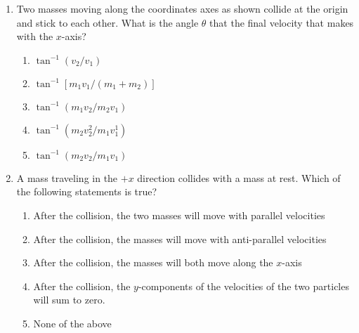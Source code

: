 \documentclass{../../../oss-apphys}
\begin{document}
\begin{multicols}{2}
\begin{enumerate}[resume,leftmargin=18pt]
  \item Two masses moving along the coordinates axes as shown collide at the
    origin and stick to each other. What is the angle $\theta$ that the final
    velocity that makes with the $x$-axis?
    \begin{center}
    \end{center}
    \begin{enumerate}[nosep,leftmargin=18pt,label=(\Alph*)]
    \item $\tan^{-1}(v_2/v_1)$
    \item $\tan^{-1}[m_1v_1/(m_1+m_2)]$
    \item $\tan^{-1}(m_1v_2/m_2v_1)$
    \item $\tan^{-1}(m_2v_2^2/m_1v_1^1)$
    \item $\tan^{-1}(m_2v_2/m_1v_1)$
    \end{enumerate}
    \columnbreak
    
  \item A mass traveling in the $+x$ direction collides with a mass at rest.
    Which of the following statements is true?
    \begin{enumerate}[nosep,leftmargin=18pt,label=(\Alph*)]
    \item After the collision, the two masses will move with parallel velocities
    \item After the collision, the masses will move with anti-parallel
      velocities
    \item After the collision, the masses will both move along the $x$-axis
    \item After the collision, the $y$-components of the velocities of the two
      particles will sum to zero.
    \item None of the above
    \end{enumerate}
  \end{enumerate}
\end{multicols}
\newpage
\end{document}
